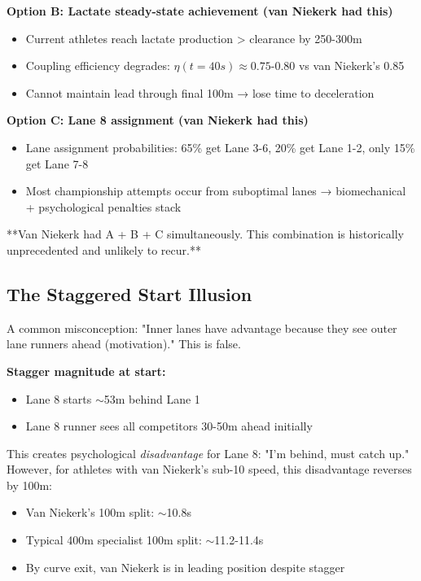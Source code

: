 \textbf{Option B: Lactate steady-state achievement (van Niekerk had this)}
\begin{itemize}
    \item Current athletes reach lactate production > clearance by 250-300m
    \item Coupling efficiency degrades: $\eta(t=40s) \approx 0.75$-0.80 vs van Niekerk's 0.85
    \item Cannot maintain lead through final 100m → lose time to deceleration
\end{itemize}

\textbf{Option C: Lane 8 assignment (van Niekerk had this)}
\begin{itemize}
    \item Lane assignment probabilities: 65\% get Lane 3-6, 20\% get Lane 1-2, only 15\% get Lane 7-8
    \item Most championship attempts occur from suboptimal lanes → biomechanical + psychological penalties stack
\end{itemize}

**Van Niekerk had A + B + C simultaneously. This combination is historically unprecedented and unlikely to recur.**

\subsection{The Staggered Start Illusion}

A common misconception: "Inner lanes have advantage because they see outer lane runners ahead (motivation)." This is false.

\textbf{Stagger magnitude at start:}
\begin{itemize}
    \item Lane 8 starts $\sim$53m behind Lane 1
    \item Lane 8 runner sees all competitors 30-50m ahead initially
\end{itemize}

This creates psychological \textit{disadvantage} for Lane 8: "I'm behind, must catch up." However, for athletes with van Niekerk's sub-10 speed, this disadvantage reverses by 100m:
\begin{itemize}
    \item Van Niekerk's 100m split: $\sim$10.8s
    \item Typical 400m specialist 100m split: $\sim$11.2-11.4s
    \item By curve exit, van Niekerk is in leading position despite stagger
\end{itemize}


